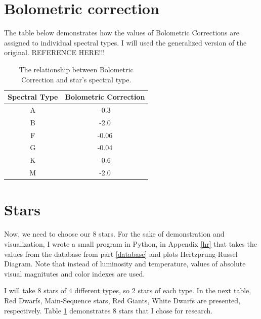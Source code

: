 \documentclass[a4paper,10pt]{article}
\begin{document}
  
  \section{Bolometric correction}
  
  The table below demonstrates how the values of Bolometric Corrections are assigned to individual spectral types. I will used the generalized version of the original. REFERENCE HERE!!!\\
  
  
  \begin{table}[h!]
    \begin{center}
      \centering
      \caption{The relationship between Bolometric Correction and star's spectral type.}
      \begin{tabular}{c | c}
        \textbf{Spectral Type} & \textbf{Bolometric Correction} \\
        \hline
        A & -0.3\\
        B & -2.0\\
        F & -0.06\\
        G & -0.04\\
        K & -0.6\\
        M & -2.0\\
      \end{tabular}
      \label{stars}
    \end{center}
  \end{table}
  
  \section{Stars}
  
  Now, we need to choose our 8 stars. For the sake of demonstration and visualization, I wrote a small program in Python, in Appendix \ref{hr} that takes the values from the database from part \ref{database} and plots Hertzprung-Russel Diagram. Note that instead of luminosity and temperature, values of absolute visual magnitutes and color indexes are used.
  
  I will take 8 stars of 4 different types, so 2 stars of each type. In the next table, Red Dwarfs, Main-Sequence stars, Red Giants, White Dwarfs are presented, respectively. Table \ref{stars} demonstrates 8 stars that I chose for research.
  
\end{document}
